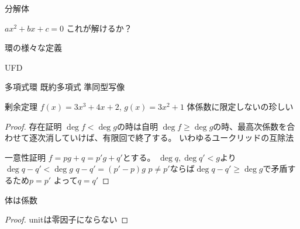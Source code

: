 \documentclass[11pt]{jsarticle}
\theoremstyle{jplain}
\begin{document}
    分解体

    $ax^2+bx+c=0$
    これが解けるか？

    環の様々な定義

    UFD
%    
    
    \AAAAAAAA

    多項式環
    既約多項式
    準同型写像

    剰余定理
    $f(x)=3x^3+4x+2$, $g(x)=3x^2+1$
    体係数に限定しないの珍しい
    \begin{proof}
        存在証明
        $\deg{f} < \deg{g}$の時は自明
        $\deg{f} \geq \deg{g}$の時、最高次係数を合わせて逐次消していけば、有限回で終了する。
        いわゆるユークリッドの互除法

        一意性証明
        $f=pg+q=p'g+q'$とする。
        $\deg{q}, \deg{q'} < {g}$より$\deg{q-q'}<\deg{g}$
        $q-q'=(p'-p)g$
        $p\neq p'$ならば$\deg{q-q'}\geq\deg{g}$で矛盾するため$p=p'$
        よって$q=q'$
    \end{proof}

    体は係数
    \begin{proof}
        unitは零因子にならない
    \end{proof}
\end{document}
